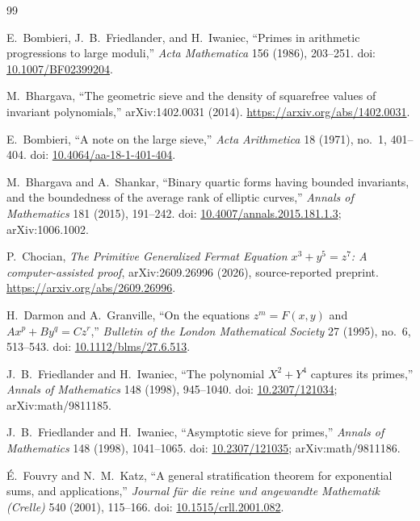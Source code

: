 \documentclass[11pt,a4paper]{article}
\begin{document}
\begingroup
\small
\raggedright
\setlength{\itemsep}{0pt}
\setlength{\parskip}{0pt}
\setlength{\parsep}{0pt}
\begin{thebibliography}{99}

E.~Bombieri, J.~B.~Friedlander, and H.~Iwaniec, ``Primes in arithmetic
progressions to large moduli,''
\emph{Acta Mathematica} 156 (1986), 203--251. doi:
\href{https://doi.org/10.1007/BF02399204}{10.1007/BF02399204}.

M.~Bhargava, ``The geometric sieve and the density of squarefree values
of invariant polynomials,'' arXiv:1402.0031 (2014).
\url{https://arxiv.org/abs/1402.0031}.

E.~Bombieri, ``A note on the large sieve,''
\emph{Acta Arithmetica} 18 (1971), no.\ 1, 401--404. doi:
\href{https://doi.org/10.4064/aa-18-1-401-404}{10.4064/aa-18-1-401-404}.

M.~Bhargava and A.~Shankar, ``Binary quartic forms having bounded
invariants, and the boundedness of the average rank of elliptic
curves,'' \emph{Annals of Mathematics} 181 (2015), 191--242.
doi: \href{https://doi.org/10.4007/annals.2015.181.1.3}{10.4007/annals.2015.181.1.3};
arXiv:1006.1002.

P.~Chocian, \emph{The Primitive Generalized Fermat Equation
$x^3+y^5=z^7$: A computer-assisted proof},
arXiv:2609.26996 (2026), source-reported preprint.
\url{https://arxiv.org/abs/2609.26996}.

H.~Darmon and A.~Granville, ``On the equations $z^m=F(x,y)$ and
$Ax^p+By^q=Cz^r$,''
\emph{Bulletin of the London Mathematical Society} 27 (1995),
no.\ 6, 513--543. doi:
\href{https://doi.org/10.1112/blms/27.6.513}{10.1112/blms/27.6.513}.

J.~B.~Friedlander and H.~Iwaniec, ``The polynomial $X^2+Y^4$ captures
its primes,'' \emph{Annals of Mathematics} 148 (1998), 945--1040.
doi: \href{https://doi.org/10.2307/121034}{10.2307/121034};
arXiv:math/9811185.

J.~B.~Friedlander and H.~Iwaniec, ``Asymptotic sieve for primes,''
\emph{Annals of Mathematics} 148 (1998), 1041--1065.
doi: \href{https://doi.org/10.2307/121035}{10.2307/121035};
arXiv:math/9811186.

\'E.~Fouvry and N.~M.~Katz, ``A general stratification theorem for
exponential sums, and applications,''
\emph{Journal f\"ur die reine und angewandte Mathematik (Crelle)}
540 (2001), 115--166. doi:
\href{https://doi.org/10.1515/crll.2001.082}{10.1515/crll.2001.082}.


\end{thebibliography}
\end{document}
